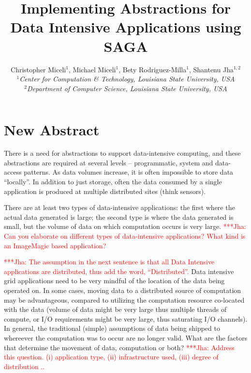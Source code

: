 \documentclass[a4paper,11pt]{article}
\newcommand{\jhanote}[1]{ {\textcolor{red} { ***Jha: #1 }}}
\newcommand{\jhanote}[1]{}
\begin{document}
\title{\large Implementing Abstractions for Data Intensive Applications using SAGA}

\author{Christopher Miceli$^{1}$, Michael Miceli$^{1}$, Bety Rodriguez-Milla$^{1}$, Shantenu Jha$^{1,2}$\\
  \small{\emph{$^{1}$Center for Computation \& Technology, Louisiana State University, USA}}\\
  \small{\emph{$^{2}$Department of Computer Science, Louisiana State
      University, USA}}}

\maketitle

\section{New Abstract}

There is a need for abstractions to support data-intensive computing, and these abstractions are required at several levels -- programmatic, system and data-access patterns.  As data volumes increase, it is often impossible to store data ``locally''. In addition to just storage, often the data consumed by a single application is produced at multiple distributed sites (think sensors).

There are at least two types of data-intensive applications: the first where the actual data generated is large; the second type is where the data generated is small, but the volume of data on which computation occurs is very large. \jhanote{Can you elaborate on different types of data-intensive applications? What kind is
an ImageMagic based application?}

\jhanote{The assumption in the next sentence is that all Data Intensive applications are distributed, thus add the word, ``Distributed''.} Data intensive grid applications need to be very mindful of the location of the data being operated on.  In some cases, moving data to a distributed source of computation may be advantageous, compared to utilizing the computation resource co-located with the data (volume of data might be very large thus multiple threads of compute, or I/O requirements might be very large, thus saturating I/O channels). In general, the traditional (simple) assumptions of data being shipped to whereever the computation was to occur are no longer valid. What are the factors that determine the movement of data, computation or both?
\jhanote{Address this question. (i) application type, (ii) infrastructure used, (iii) degree of distribution .. }
\end{document}
